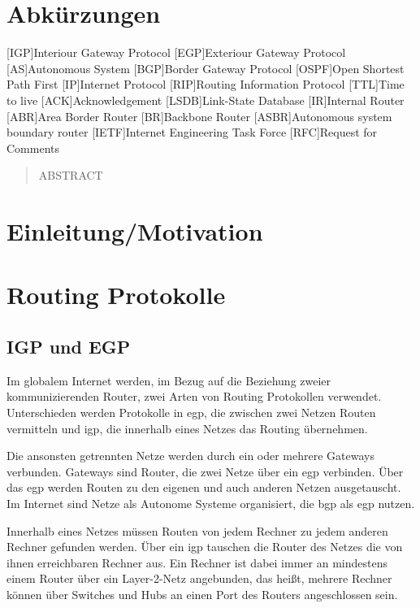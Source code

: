\documentclass[11pt,a4paper,final]{article}
\begin{document}
\section*{Abkürzungen}
\begin{acronym}
		[IGP]{Interiour Gateway Protocol}
		[EGP]{Exteriour Gateway Protocol}
		[AS]{Autonomous System}
		[BGP]{Border Gateway Protocol}
		{Open Shortest Path First}
		[IP]{Internet Protocol}
		[RIP]{Routing Information Protocol}
		[TTL]{Time to live}
		[ACK]{Acknowledgement}
		{Link-State Database}
		[IR]{Internal Router}
		[ABR]{Area Border Router}
		[BR]{Backbone Router}
		{Autonomous system boundary router}
		{Internet Engineering Task Force}
		[RFC]{Request for Comments}
\end{acronym}
\newpage
\setcounter{page}{1}
\begin{abstract}
ABSTRACT

\end{abstract}

\section{Einleitung/Motivation}
\section{Routing Protokolle}
\subsection{IGP und EGP}
Im globalem Internet werden, im Bezug auf die Beziehung zweier kommunizierenden Router, zwei Arten von Routing Protokollen verwendet. Unterschieden werden Protokolle in \ac{egp}, die zwischen zwei Netzen Routen vermitteln und \ac{igp}, die innerhalb eines Netzes das Routing übernehmen.

Die ansonsten getrennten Netze werden durch ein oder mehrere Gateways verbunden. Gateways sind Router, die zwei Netze über ein \ac{egp} verbinden. Über das \ac{egp} werden Routen zu den eigenen und auch anderen Netzen ausgetauscht. Im Internet sind Netze als Autonome Systeme organisiert, die \ac{bgp} als \ac{egp} nutzen.

Innerhalb eines Netzes müssen Routen von jedem Rechner zu jedem anderen Rechner gefunden werden. Über ein \ac{igp} tauschen die Router des Netzes die von ihnen erreichbaren Rechner aus.
Ein Rechner ist dabei immer an mindestens einem Router über ein Layer-2-Netz angebunden, das heißt, mehrere Rechner können über Switches und Hubs an einen Port des Routers angeschlossen sein.
\end{document}
